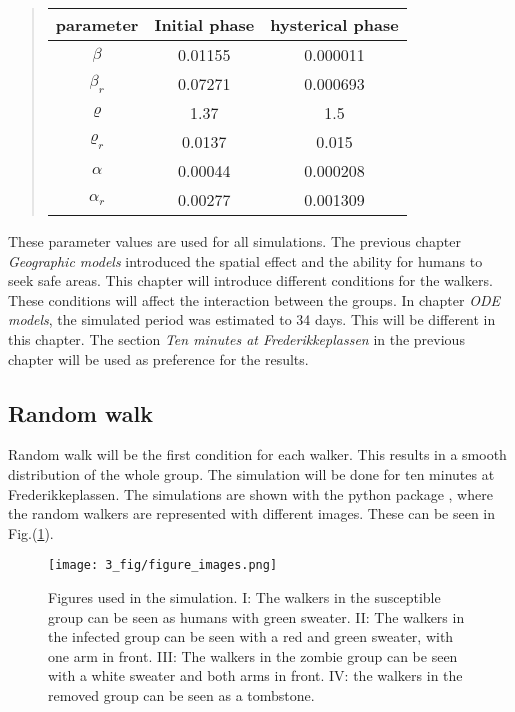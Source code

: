 \documentclass[%
twoside,                 %
final,                   %
chapterprefix=true,      %
open=right               %
10pt]{book}
\begin{document}
\label{table:param_val_random}

\begin{quote}
\begin{tabular}{ccc}
\hline
\multicolumn{1}{c}{ parameter } & \multicolumn{1}{c}{ Initial phase } & \multicolumn{1}{c}{ hysterical phase } \\
\hline
$\beta$     & 0.01155       & 0.000011         \\
$\beta_r$   & 0.07271       & 0.000693         \\
$\varrho$   & 1.37          & 1.5              \\
$\varrho_r$ & 0.0137        & 0.015            \\
$\alpha$    & 0.00044       & 0.000208         \\
$\alpha_r$  & 0.00277       & 0.001309         \\
\hline
\end{tabular}
\end{quote}

\noindent
These parameter values are used for all simulations. The previous chapter \emph{Geographic models} introduced the spatial effect and the ability for humans to seek safe areas. This chapter will introduce different conditions for the walkers. These conditions will affect the interaction between the groups. In chapter \emph{ODE models}, the simulated period was estimated to 34 days. This will be different in this chapter. The section \emph{Ten minutes at Frederikkeplassen} in the previous chapter will be used as preference for the results. 

\subsection{Random walk}
Random walk will be the first condition for each walker. This results in a smooth distribution of the whole group. The simulation will be done for ten minutes at Frederikkeplassen. The simulations are shown with the python package , where the random walkers are represented with different images. These can be seen in Fig.(\ref{fig:figure_images}).


\begin{figure}[ht]
  \centerline{\texttt{[image: 3\_fig/figure\_images.png]}}
  \caption{
  \label{fig:figure_images} Figures used in the simulation. I: The walkers in the susceptible group can be seen as humans with green sweater. II: The walkers in the infected group can be seen with a red and green sweater, with one arm in front. III: The walkers in the zombie group can be seen with a white sweater and both arms in front. IV: the walkers in the removed group can be seen as a tombstone.
  }
\end{figure}
\end{document}
